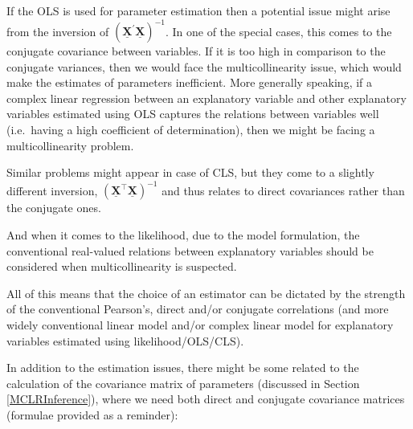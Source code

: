 \documentclass[
]{book}
\begin{document}
If the OLS is used for parameter estimation then a potential issue might arise from the inversion of \(\left( \underline{\mathbf{X}}^\prime \underline{\mathbf{X}}\right)^{-1}\). In one of the special cases, this comes to the conjugate covariance between variables. If it is too high in comparison to the conjugate variances, then we would face the multicollinearity issue, which would make the estimates of parameters inefficient. More generally speaking, if a complex linear regression between an explanatory variable and other explanatory variables estimated using OLS captures the relations between variables well (i.e.~having a high coefficient of determination), then we might be facing a multicollinearity problem.

Similar problems might appear in case of CLS, but they come to a slightly different inversion, \(\left( \underline{\mathbf{X}}^\top \underline{\mathbf{X}}\right)^{-1}\) and thus relates to direct covariances rather than the conjugate ones.

And when it comes to the likelihood, due to the model formulation, the conventional real-valued relations between explanatory variables should be considered when multicollinearity is suspected.

All of this means that the choice of an estimator can be dictated by the strength of the conventional Pearson's, direct and/or conjugate correlations (and more widely conventional linear model and/or complex linear model for explanatory variables estimated using likelihood/OLS/CLS).

In addition to the estimation issues, there might be some related to the calculation of the covariance matrix of parameters (discussed in Section \ref{MCLRInference}), where we need both direct and conjugate covariance matrices (formulae provided as a reminder):
\end{document}
